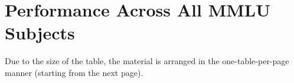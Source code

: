 \clearpage
\section{Performance Across All MMLU Subjects}
Due to the size of the table, the material is arranged in the one-table-per-page manner (starting from the next page).






